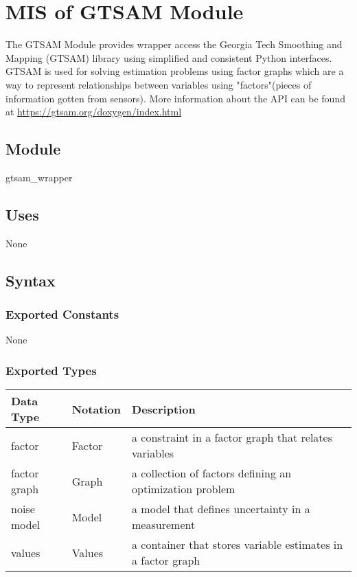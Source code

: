 \documentclass[12pt, titlepage]{article}
\begin{document}
\newpage

\section{MIS of GTSAM Module} \label{M_GTSAM} 


The GTSAM Module provides wrapper access the Georgia Tech Smoothing and Mapping (GTSAM) library using simplified and consistent Python interfaces. GTSAM is used for solving estimation problems using factor graphs which are a way to represent relationships between variables using "factors"(pieces of information gotten from sensors). More information about the API can be found at \url{https://gtsam.org/doxygen/index.html}

\subsection{Module}

gtsam\_wrapper

\subsection{Uses}
None

\subsection{Syntax}

\subsubsection{Exported Constants}
None
\subsubsection{Exported Types}

\begin{center}
  \renewcommand{\arraystretch}{1.2}
  \noindent 
  \begin{tabular}{l l p{7.5cm}} 
  \toprule 
  \textbf{Data Type} & \textbf{Notation} & \textbf{Description}\\ 
  \midrule
  factor & Factor & a constraint in a factor graph that relates variables\\
  factor graph & Graph & a collection of factors defining an optimization problem\\
  noise model & Model & a model that defines uncertainty in a measurement \\
  values & Values & a container that stores variable estimates in a factor graph\\
  \bottomrule
  \end{tabular} 
  \end{center}
\end{document}

